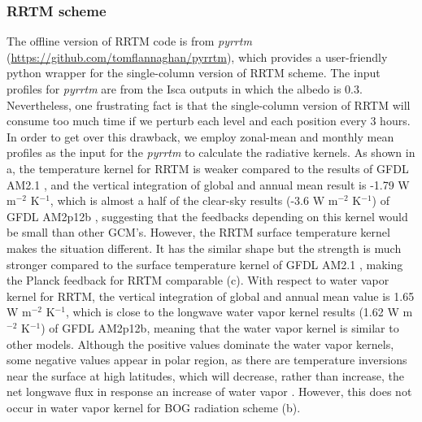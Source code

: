 \subsubsection{RRTM scheme} The offline version of RRTM code is from \textit{pyrrtm} (\url{https://github.com/tomflannaghan/pyrrtm}), which provides a user-friendly python wrapper for the single-column version of RRTM scheme. The input profiles for \textit{pyrrtm} are from the Isca outputs in which the albedo is 0.3. Nevertheless, one frustrating fact is that the single-column version of RRTM will consume too much time if we perturb each level and each position every 3 hours. In order to get over this drawback, we employ zonal-mean and monthly mean profiles as the input for the \textit{pyrrtm} to calculate the radiative kernels. As shown in a, the temperature kernel for RRTM is weaker compared to the results of GFDL AM2.1 \citep[see their Fig. A1 of][]{Feldl2017coupled}, and the vertical integration of global and annual mean result is -1.79 W m$^{-2}$ K$^{-1}$, which is almost a half of the clear-sky results (-3.6 W m$^{-2}$ K$^{-1}$) of GFDL AM2p12b \citep{Soden2008}, suggesting that the feedbacks depending on this kernel would be small than other GCM's. However, the RRTM surface temperature kernel makes the situation different. It has the similar shape but the strength is much stronger compared to the surface temperature kernel of GFDL AM2.1 \citep[see their Fig. A1 of][]{Feldl2017coupled}, making the Planck feedback for RRTM comparable (c). With respect to water vapor kernel for RRTM, the vertical integration of global and annual mean value is 1.65 W m$^{-2}$ K$^{-1}$, which is close to the longwave water vapor kernel results (1.62 W m$^{-2}$ K$^{-1}$) of GFDL AM2p12b, meaning that the water vapor kernel is similar to other models. Although the positive values dominate the water vapor kernels, some negative values appear in polar region, as there are temperature inversions near the surface at high latitudes, which will decrease, rather than increase, the net longwave flux in response an increase of water vapor \citep{Soden2008}. However, this does not occur in water vapor kernel for BOG radiation scheme (b).


